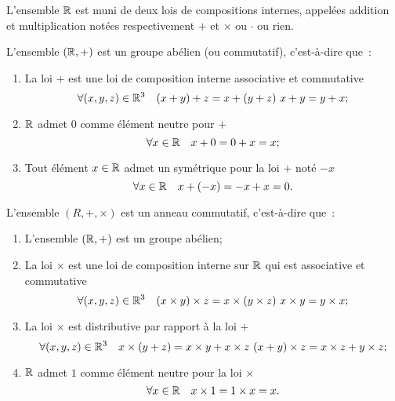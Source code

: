 L'ensemble \(\mathbb{R}\) est muni de deux lois de compositions internes, appelées 
addition et multiplication notées respectivement \( + \) et \(\times\) ou 
\(\cdot\) ou rien.
\begin{prop}
  L'ensemble \((\mathbb{R}, +)\) est un groupe abélien (ou commutatif), c'est-à-dire 
  que~:
  \begin{enumerate}
    \item La loi \( + \) est une loi de composition interne associative et 
      commutative
      \begin{equation}
        \forall (x, y, z) \in \mathbb{R}^3 \quad (x + y) + z = x + (y + z) \ x + y = y + 
        x;
      \end{equation}
    \item \(\mathbb{R}\) admet \(0\) comme élément neutre pour \( + \)
      \begin{equation}
        \forall x \in \mathbb{R} \quad x + 0 = 0 + x = x;
      \end{equation}
    \item Tout élément \(x\in\mathbb{R}\) admet un symétrique pour la loi \( + \) noté 
      \( - x\)
      \begin{equation}
        \forall x \in \mathbb{R} \quad x + ( - x) = -x + x = 0.
      \end{equation}
  \end{enumerate}
\end{prop}
\begin{prop}
  L'ensemble \((R, +, \times)\) est un anneau commutatif, c'est-à-dire que~:
  \begin{enumerate}
    \item L'ensemble \((\mathbb{R}, +)\) est un groupe abélien;
    \item La loi \(\times\) est une loi de composition interne sur \(\mathbb{R}\) qui 
      est associative et commutative
      \begin{equation}
        \forall (x, y, z) \in \mathbb{R}^3 \quad (x\times y)\times z = x\times (y\times 
        z) \ x\times y = y\times x;
      \end{equation}
    \item La loi \(\times\) est distributive par rapport à la loi \( + \)
      \begin{equation}
        \forall (x, y, z) \in \mathbb{R}^3 \quad x\times(y + z) = x\times y + x\times z 
        \ (x + y)\times z = x\times z + y\times z;
      \end{equation}
    \item \(\mathbb{R}\) admet \(1\) comme élément neutre pour la loi \(\times\)
      \begin{equation}
        \forall x \in \mathbb{R} \quad x\times 1 = 1\times x = x.
      \end{equation}
  \end{enumerate}
\end{prop}
